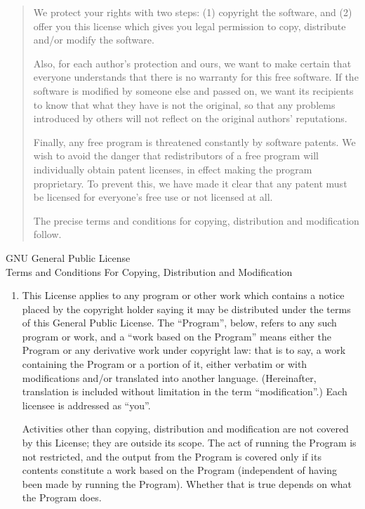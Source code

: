 \documentclass{book}
\begin{document}
{\begin{center}
\begin{quote}
We protect your rights with two steps: (1) copyright the software, and (2)
offer you this license which gives you legal permission to copy,
distribute and/or modify the software.

Also, for each author's protection and ours, we want to make certain that
everyone understands that there is no warranty for this free software.  If
the software is modified by someone else and passed on, we want its
recipients to know that what they have is not the original, so that any
problems introduced by others will not reflect on the original authors'
reputations.

Finally, any free program is threatened constantly by software patents.
We wish to avoid the danger that redistributors of a free program will
individually obtain patent licenses, in effect making the program
proprietary.  To prevent this, we have made it clear that any patent must
be licensed for everyone's free use or not licensed at all.

The precise terms and conditions for copying, distribution and
modification follow.
\end{quote}
\end{center}



\begin{center}
{\Large \sc GNU General Public License
\\\vspace{3mm}Terms and Conditions For Copying, Distribution and Modification}
\end{center}


\begin{enumerate}

\addtocounter{enumi}{-1}

\item 

This License applies to any program or other work which contains a notice
placed by the copyright holder saying it may be distributed under the
terms of this General Public License.  The ``Program'', below, refers to
any such program or work, and a ``work based on the Program'' means either
the Program or any derivative work under copyright law: that is to say, a
work containing the Program or a portion of it, either verbatim or with
modifications and/or translated into another language.  (Hereinafter,
translation is included without limitation in the term ``modification''.)
Each licensee is addressed as ``you''.

Activities other than copying, distribution and modification are not
covered by this License; they are outside its scope.  The act of
running the Program is not restricted, and the output from the Program
is covered only if its contents constitute a work based on the
Program (independent of having been made by running the Program).
Whether that is true depends on what the Program does.


\end{enumerate}}
\end{document}
